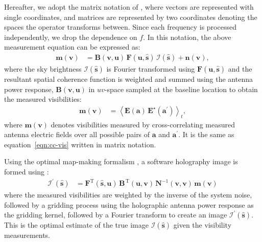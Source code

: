 \documentclass[a4paper,fleqn,usenatbib]{mnras}
\begin{document}
Hereafter, we adopt the matrix notation of \citet{mor11}, where vectors are represented with single coordinates, and matrices are represented by two coordinates denoting the spaces the operator transforms between. Since each frequency is processed independently, we drop the dependence on $f$. In this notation, the above measurement equation can be expressed as:
\begin{align}
  \mathbf{m}(\mathbf{v}) &= \mathbf{B}(\mathbf{v},\mathbf{u})\,\mathbf{F}(\mathbf{u},\hat{\mathbf{s}})\,\boldsymbol{\mathcal{I}}(\hat{\mathbf{s}}) + \mathbf{n}(\mathbf{v}),
\end{align}
where the sky brightness $\boldsymbol{\mathcal{I}}(\hat{\mathbf{s}})$ is Fourier transformed using $\mathbf{F}(\mathbf{u},\hat{\mathbf{s}})$ and the resultant spatial coherence function is weighted and summed using the antenna power response, $\mathbf{B}(\mathbf{v},\mathbf{u})$ in $uv$-space sampled at the baseline location to obtain the measured visibilities:
\begin{align}
  \mathbf{m}(\mathbf{v}) &= \left\langle \mathbf{E}(\mathbf{a})\,\mathbf{E}^\star(\mathbf{a}^\prime)\right\rangle_t, \label{eqn:matrix-cc-vis}
\end{align}
where $\mathbf{m}(\mathbf{v})$ denotes visibilities measured by cross-correlating measured antenna electric fields over all possible pairs of $\mathbf{a}$ and $\mathbf{a}^\prime$. It is the same as equation~\ref{eqn:cc-vis} written in matrix notation.

Using the optimal map-making formalism \citep{teg97a,teg97b}, a software holography image is formed using \citep{mor09}:
\begin{align}
  \boldsymbol{\mathcal{I}}^\prime(\hat{\mathbf{s}}) &= \mathbf{F}^\textrm{T}(\hat{\mathbf{s}},\mathbf{u})\,\mathbf{B}^{\,\textrm{T}}(\mathbf{u},\mathbf{v})\,\mathbf{N}^{-1}(\mathbf{v},\mathbf{v})\,\mathbf{m}(\mathbf{v}) \label{eqn:dirty-image-FX}
\end{align}
where the measured visibilities are weighted by the inverse of the system noise, followed by a gridding process using the holographic antenna power response as the gridding kernel, followed by a Fourier transform to create an image $\boldsymbol{\mathcal{I}}^\prime(\hat{\mathbf{s}})$. This is the optimal estimate of the true image $\boldsymbol{\mathcal{I}}(\hat{\mathbf{s}})$ given the visibility measurements.
\end{document}
